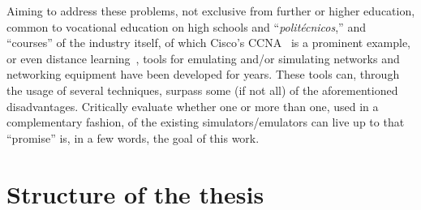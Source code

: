 Aiming to address these problems, not exclusive from further or higher education, common to vocational education on high schools and ``\emph{politécnicos},'' and ``courses'' of the industry itself, of which Cisco's CCNA~\cite{ccna} is a prominent example, or even distance learning~\cite{networkvirtwithgns}, tools for emulating and/or simulating networks and networking equipment have been developed for years. %
These tools can, through the usage of several techniques, surpass some (if not all) of the aforementioned disadvantages.
Critically evaluate whether one or more than one, used in a complementary fashion, of the existing simulators/emulators can live up to that ``promise'' is, in a few words, the goal of this work.



\section{Structure of the thesis}
\label{sec:structure}

